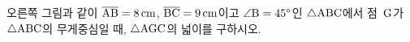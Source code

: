 \noindent\begin{minipage}[t]{0.58\linewidth}\vspace{0pt}\raggedright 오른쪽 그림과 같이 $\overline{\mathrm{AB}}=8\,\mathrm{cm}$, $\overline{\mathrm{BC}}=9\,\mathrm{cm}$이고 $\angle\mathrm{B}=45^\circ$인 $\triangle\mathrm{ABC}$에서 점~$\mathrm{G}$가 $\triangle\mathrm{ABC}$의 무게중심일 때, $\triangle\mathrm{AGC}$의 넓이를 구하시오.\end{minipage}\hfill\begin{minipage}[t]{0.4\linewidth}\vspace{0pt}\centering \resizebox{\ifdim\width>\linewidth\linewidth\else\width\fi}{!}{}\end{minipage}\par
